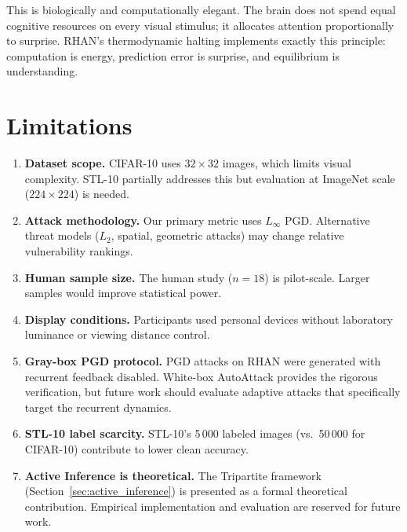\documentclass[12pt,a4paper]{article}
\begin{document}
This is biologically and computationally elegant. The brain does not spend
equal cognitive resources on every visual stimulus; it allocates attention
proportionally to surprise. RHAN's thermodynamic halting implements exactly
this principle: computation is energy, prediction error is surprise, and
equilibrium is understanding.


\section{Limitations}
\label{sec:limitations}

\begin{enumerate}[leftmargin=1.5em]
  \item \textbf{Dataset scope.} CIFAR-10 uses $32{\times}32$ images, which
        limits visual complexity. STL-10 partially addresses this but
        evaluation at ImageNet scale ($224{\times}224$) is needed.
  \item \textbf{Attack methodology.} Our primary metric uses $L_\infty$ PGD.
        Alternative threat models ($L_2$, spatial, geometric attacks) may
        change relative vulnerability rankings.
  \item \textbf{Human sample size.} The human study ($n{=}18$) is pilot-scale.
        Larger samples would improve statistical power.
  \item \textbf{Display conditions.} Participants used personal devices
        without laboratory luminance or viewing distance control.
  \item \textbf{Gray-box PGD protocol.} PGD attacks on RHAN were generated
        with recurrent feedback disabled. White-box AutoAttack provides the
        rigorous verification, but future work should evaluate adaptive
        attacks that specifically target the recurrent dynamics.
  \item \textbf{STL-10 label scarcity.} STL-10's 5\,000 labeled images
        (vs.\ 50\,000 for CIFAR-10) contribute to lower clean accuracy.
  \item \textbf{Active Inference is theoretical.} The Tripartite framework
        (Section~\ref{sec:active_inference}) is presented as a formal
        theoretical contribution. Empirical implementation and evaluation
        are reserved for future work.
\end{enumerate}

\end{document}

